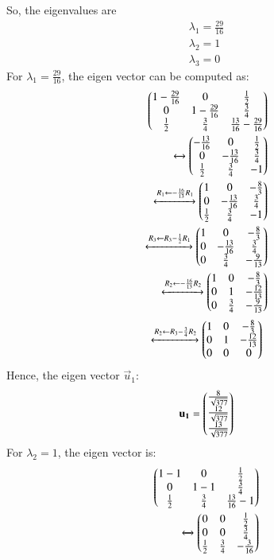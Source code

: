 	So, the eigenvalues are 
\begin{align}
	\lambda_1 = \frac{29}{16}	\\
	\lambda_2 = 1	\\
	\lambda_3 = 0
\end{align}
For $\lambda_1 = \frac{29}{16}$, the eigen vector can be computed as:
\begin{align}
	\begin{pmatrix}1-\frac{29}{16} & 0 & \frac{1}{2} \\
	 0 & 1 - \frac{29}{16} & \frac{3}{4} \\
	\frac{1}{2} & \frac{3}{4} & \frac{13}{16}-\frac{29}{16} \end{pmatrix}  \\
	\xleftrightarrow[]{}
	\begin{pmatrix}-\frac{13}{16} & 0 & \frac{1}{2}\\ 
	0 & -\frac{13}{16} & \frac{3}{4} \\
	\frac{1}{2} & \frac{3}{4} & -1\end{pmatrix} \\
	\xleftrightarrow[]{R_1 \leftarrow - \frac{16}{13}R_1}
	\begin{pmatrix}1 & 0 & -\frac{8}{3} \\ 0 & -\frac{13}{16} & \frac{3}{4} \\
	\frac{1}{2} & \frac{3}{4} & -1\end{pmatrix} \\
	\xleftrightarrow[]{R_3 \leftarrow R_3-\frac{1}{2}R_1}
	\begin{pmatrix}1 & 0 & -\frac{8}{3} \\ 0 & -\frac{13}{16} & \frac{3}{4} \\
	0 & \frac{3}{4} & -\frac{9}{13} \end{pmatrix} \\
	\xleftrightarrow[]{R_2 \leftarrow -\frac{16}{13}R_2}
	\begin{pmatrix}1 & 0 & -\frac{8}{3} \\ 0 & 1 & -\frac{12}{13} \\
	0 & \frac{3}{4} & -\frac{9}{13} \end{pmatrix} 
\end{align}
\begin{align}
	\xleftrightarrow[]{R_2 \leftarrow R_3-\frac{3}{4}R_2}
	\begin{pmatrix}1 & 0 & -\frac{8}{3} \\ 0 & 1 & -\frac{12}{13} \\
	0 & 0 & 0 \end{pmatrix}
\end{align}
Hence, the eigen vector $\vec{u}_1$:
\begin{align}
	\mathbf{u_1}= \begin{pmatrix}\frac{8}{\sqrt{377}} \\ \frac{12}{\sqrt{377}} \\
	\frac{13}{\sqrt{377}} \end{pmatrix}
\end{align}
For $\lambda_2=1$, the eigen vector is:
\begin{align}
	\begin{pmatrix}1-1 & 0 & \frac{1}{2} \\ 0 & 1-1 & \frac{3}{4} \\
	\frac{1}{2} & \frac{3}{4} & \frac{13}{16}-1 \end{pmatrix}  \\
	\xleftrightarrow[]{}
	\begin{pmatrix}0 & 0 & \frac{1}{2} \\ 0 & 0 & \frac{3}{4} \\
	\frac{1}{2} & \frac{3}{4} & -\frac{3}{16} \end{pmatrix}  
\end{align}
